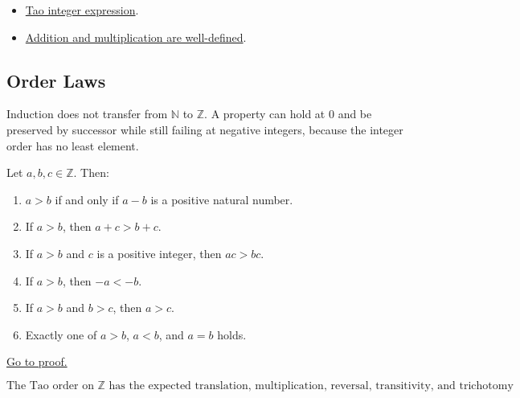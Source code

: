 \begin{dependencies}
\begin{itemize}
  \item \hyperref[def:tao-integer-expression]{Tao integer expression}.
  \item \hyperref[lem:int-well-defined]{Addition and multiplication are well-defined}.
\end{itemize}
\end{dependencies}

\subsection*{Order Laws}

\begin{remark*}[Exposition]
Induction does not transfer from \(\mathbb{N}\) to \(\mathbb{Z}\). A property
can hold at \(0\) and be preserved by successor while still failing at negative
integers, because the integer order has no least element.
\end{remark*}

\begin{lemma}
\label{lem:int-order}
Let \(a,b,c\in\mathbb{Z}\). Then:
\begin{enumerate}
  \item \(a>b\) if and only if \(a-b\) is a positive natural number.
  \item If \(a>b\), then \(a+c>b+c\).
  \item If \(a>b\) and \(c\) is a positive integer, then \(ac>bc\).
  \item If \(a>b\), then \(-a<-b\).
  \item If \(a>b\) and \(b>c\), then \(a>c\).
  \item Exactly one of \(a>b\), \(a<b\), and \(a=b\) holds.
\end{enumerate}
\hyperref[prf:int-order]{Go to proof.}
\end{lemma}

\begin{remark*}
\[
  \text{The Tao order on } \mathbb{Z}
  \text{ has the expected translation, multiplication, reversal,
  transitivity, and trichotomy properties.}
\]
\end{remark*}

